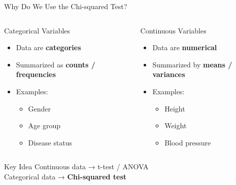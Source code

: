 \documentclass{beamer}					%
\begin{document}
\begin{frame}{Why Do We Use the Chi-squared Test?}

\small
\begin{columns}[T,onlytextwidth]

\begin{block}{Categorical Variables}
\begin{itemize}
    \item Data are \textbf{categories}
    \item Summarized as \textbf{counts / frequencies}
    \item Examples:
    \begin{itemize}
        \item Gender
        \item Age group
        \item Disease status
    \end{itemize}
\end{itemize}
\end{block}

\begin{block}{Continuous Variables}
\begin{itemize}
    \item Data are \textbf{numerical}
    \item Summarized by \textbf{means / variances}
    \item Examples:
    \begin{itemize}
        \item Height
        \item Weight
        \item Blood pressure
    \end{itemize}
\end{itemize}
\end{block}

\end{columns}

\vspace{0.6em}
\begin{alertblock}{Key Idea}
Continuous data → t-test / ANOVA \\
Categorical data → \textbf{Chi-squared test}
\end{alertblock}

\end{frame}
\end{document}
